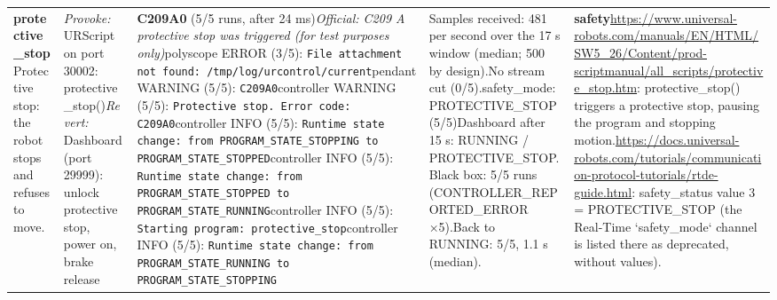 \documentclass[10pt]{article}
\begin{document}
\begin{longtable}{@{}>{\raggedright\arraybackslash}p{2.7cm}>{\raggedright\arraybackslash}p{4.0cm}>{\raggedright\arraybackslash}p{7.6cm}>{\raggedright\arraybackslash}p{5.2cm}>{\raggedright\arraybackslash}p{6.0cm}@{}}
\textbf{protective\_\allowbreak{}stop}\newline Protective stop: the robot stops and refuses to move. & \textit{Provoke:} URScript on port 30002: protective\_\allowbreak{}stop()\newline\textit{Revert:} Dashboard (port 29999): unlock protective stop,\allowbreak{} power on,\allowbreak{} brake release & \textbf{C209A0} (5/5 runs, after 24 ms)\newline \textit{Official: C209 A protective stop was triggered (for test purposes only)}\newline \textsf{polyscope} ERROR (3/5): \texttt{File attachment not found: /tmp/log/urcontrol/current}\newline \textsf{pendant} WARNING (5/5): \texttt{C209A0}\newline \textsf{controller} WARNING (5/5): \texttt{Protective stop. Error code: C209A0}\newline \textsf{controller} INFO (5/5): \texttt{Runtime state change: from PROGRAM\_\allowbreak{}STATE\_\allowbreak{}STOPPING to PROGRAM\_\allowbreak{}STATE\_\allowbreak{}STOPPED}\newline \textsf{controller} INFO (5/5): \texttt{Runtime state change: from PROGRAM\_\allowbreak{}STATE\_\allowbreak{}STOPPED to PROGRAM\_\allowbreak{}STATE\_\allowbreak{}RUNNING}\newline \textsf{controller} INFO (5/5): \texttt{Starting program: protective\_\allowbreak{}stop}\newline \textsf{controller} INFO (5/5): \texttt{Runtime state change: from PROGRAM\_\allowbreak{}STATE\_\allowbreak{}RUNNING to PROGRAM\_\allowbreak{}STATE\_\allowbreak{}STOPPING} & Samples received: 481 per second over the 17 s window (median; 500 by design).\newline No stream cut (0/5).\newline safety\_\allowbreak{}mode: PROTECTIVE\_\allowbreak{}STOP (5/5)\newline Dashboard after 15 s: RUNNING / PROTECTIVE\_\allowbreak{}STOP.\newline Black box: 5/5 runs (CONTROLLER\_\allowbreak{}REPORTED\_\allowbreak{}ERROR ×5).\newline Back to RUNNING: 5/5, 1.1 s (median). & \textbf{safety}\newline \url{https://www.universal-robots.com/manuals/EN/HTML/SW5_26/Content/prod-scriptmanual/all_scripts/protective_stop.htm}: protective\_\allowbreak{}stop() triggers a protective stop,\allowbreak{} pausing the program and stopping motion.\newline \url{https://docs.universal-robots.com/tutorials/communication-protocol-tutorials/rtde-guide.html}: safety\_\allowbreak{}status value 3 = PROTECTIVE\_\allowbreak{}STOP (the Real-Time `safety\_\allowbreak{}mode` channel is listed there as deprecated,\allowbreak{} without values).\newline 
\end{longtable}
\end{document}
